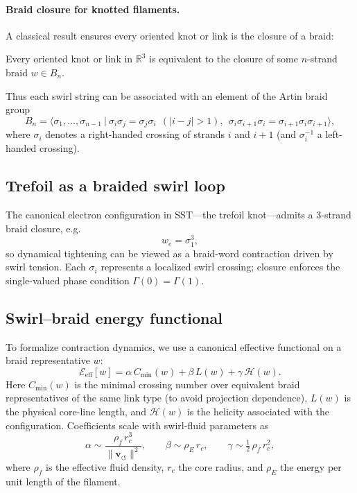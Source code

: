 \documentclass[10pt,reprint,aps,onecolumn,nofootinbib]{revtex4-2}
\begin{document}
    \paragraph*{Braid closure for knotted filaments.}
        A classical result ensures every oriented knot or link is the closure of a braid:

        \begin{theorem}
        Every oriented knot or link in \(\mathbb{R}^3\) is equivalent to the closure of some \(n\)-strand braid \(w\in B_n\).
        \end{theorem}

        Thus each swirl string can be associated with an element of the Artin braid group
        \[
            B_n = \big\langle \sigma_1,\dots,\sigma_{n-1}\ \big|\
            \sigma_i\sigma_j=\sigma_j\sigma_i\ \ (|i-j|>1),\ \
            \sigma_i\sigma_{i+1}\sigma_i=\sigma_{i+1}\sigma_i\sigma_{i+1}
            \big\rangle,
        \]
        where \(\sigma_i\) denotes a right-handed crossing of strands \(i\) and \(i{+}1\) (and \(\sigma_i^{-1}\) a left-handed crossing).

    \subsection*{Trefoil as a braided swirl loop}
        The canonical electron configuration in SST—the trefoil knot—admits a 3-strand braid closure, e.g.
        \[
            w_e = \sigma_1^3,
        \]
        so dynamical tightening can be viewed as a braid-word contraction driven by swirl tension. Each \(\sigma_i\) represents a localized swirl crossing; closure enforces the single-valued phase condition \(\Gamma(0)=\Gamma(1)\).

    \subsection*{Swirl–braid energy functional}
        To formalize contraction dynamics, we use a canonical effective functional on a braid representative \(w\):
        \begin{equation}\label{eq:Eeff-braid}
            \mathcal{E}_{\mathrm{eff}}[w] = \alpha\,C_{\min}(w) + \beta\,L(w) + \gamma\,\mathcal{H}(w).
        \end{equation}
        Here \(C_{\min}(w)\) is the minimal crossing number over equivalent braid representatives of the same link type (to avoid projection dependence), \(L(w)\) is the physical core-line length, and \(\mathcal{H}(w)\) is the helicity associated with the configuration. Coefficients scale with swirl-fluid parameters as
        \[
            \alpha \sim \frac{\rho_f\, r_c^3}{\|\mathbf{v}_{\!\boldsymbol{\circlearrowleft}}\|^{2}},\qquad
            \beta \sim \rho_E\, r_c,\qquad
            \gamma \sim \tfrac12\,\rho_f\, r_c^2,
        \]
        where \(\rho_f\) is the effective fluid density, \(r_c\) the core radius, and \(\rho_E\) the energy per unit length of the filament.
\end{document}
